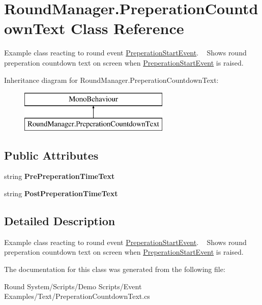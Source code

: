 \hypertarget{class_round_manager_1_1_preperation_countdown_text}{}\section{Round\+Manager.\+Preperation\+Countdown\+Text Class Reference}
\label{class_round_manager_1_1_preperation_countdown_text}


Example class reacting to round event \hyperlink{class_round_manager_1_1_events_1_1_preperation_start_event}{Preperation\+Start\+Event}. ~\newline
Shows round preperation countdown text on screen when \hyperlink{class_round_manager_1_1_events_1_1_preperation_start_event}{Preperation\+Start\+Event} is raised.  


Inheritance diagram for Round\+Manager.\+Preperation\+Countdown\+Text\+:\begin{figure}[H]
\begin{center}
\leavevmode
\includegraphics[height=2.000000cm]{class_round_manager_1_1_preperation_countdown_text}
\end{center}
\end{figure}
\subsection*{Public Attributes}
\begin{DoxyCompactItemize}
\item 
\hypertarget{class_round_manager_1_1_preperation_countdown_text_aef276f5fdb2d48fbd97b100394c03f21}{}string {\bfseries Pre\+Preperation\+Time\+Text}\label{class_round_manager_1_1_preperation_countdown_text_aef276f5fdb2d48fbd97b100394c03f21}

\item 
\hypertarget{class_round_manager_1_1_preperation_countdown_text_ad6897dfde404f2bd9a1ef8b0e21468a2}{}string {\bfseries Post\+Preperation\+Time\+Text}\label{class_round_manager_1_1_preperation_countdown_text_ad6897dfde404f2bd9a1ef8b0e21468a2}

\end{DoxyCompactItemize}


\subsection{Detailed Description}
Example class reacting to round event \hyperlink{class_round_manager_1_1_events_1_1_preperation_start_event}{Preperation\+Start\+Event}. ~\newline
Shows round preperation countdown text on screen when \hyperlink{class_round_manager_1_1_events_1_1_preperation_start_event}{Preperation\+Start\+Event} is raised. 



The documentation for this class was generated from the following file\+:\begin{DoxyCompactItemize}
\item 
Round System/\+Scripts/\+Demo Scripts/\+Event Examples/\+Text/Preperation\+Countdown\+Text.\+cs\end{DoxyCompactItemize}
